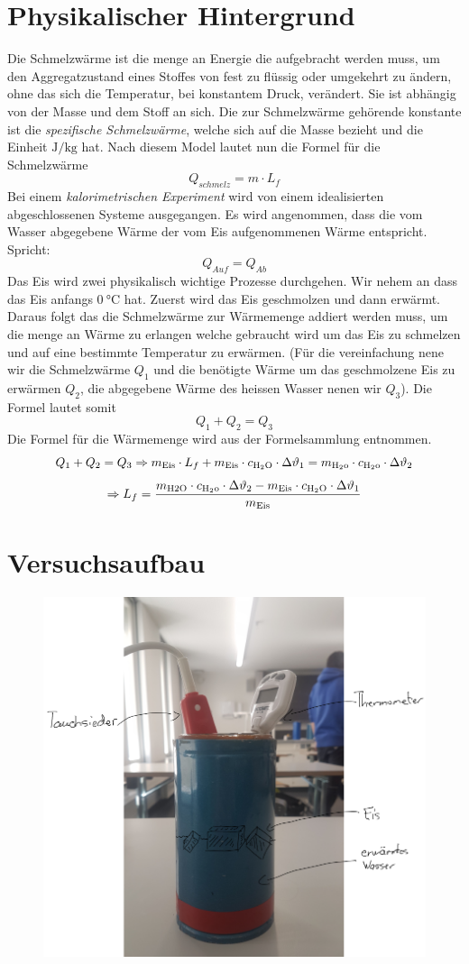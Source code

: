 \documentclass[a4paper,12pt]{article}
\begin{document}
\section{Physikalischer Hintergrund}
Die Schmelzwärme ist die menge an Energie die aufgebracht werden muss, um den Aggregatzustand eines Stoffes von fest zu flüssig oder umgekehrt zu ändern, ohne das sich die Temperatur, bei konstantem Druck, verändert. Sie ist abhängig von der Masse und dem Stoff an sich. Die zur Schmelzwärme gehörende konstante ist die \textit{spezifische Schmelzwärme}, welche sich auf die Masse bezieht und die Einheit $\si{\J\per\kg}$ hat. Nach diesem Model lautet nun die Formel für die Schmelzwärme 
$$ Q_{schmelz}= m \cdot L_f$$
Bei einem \textit{kalorimetrischen Experiment} wird von einem idealisierten abgeschlossenen Systeme ausgegangen. Es wird angenommen, dass die vom Wasser abgegebene Wärme der vom Eis aufgenommenen Wärme entspricht. Spricht:
$$ Q_{Auf}=Q_{Ab}$$
Das Eis wird zwei physikalisch wichtige Prozesse durchgehen. Wir nehem an dass das Eis anfangs $\SI{0}{\celsius}$ hat. Zuerst wird das Eis geschmolzen und dann erwärmt. Daraus folgt das die Schmelzwärme zur Wärmemenge addiert werden muss, um die menge an Wärme zu erlangen welche gebraucht wird um das Eis zu schmelzen und auf eine bestimmte Temperatur zu erwärmen. (Für die vereinfachung nene wir die Schmelzwärme $Q_{1}$ und die benötigte Wärme um das geschmolzene Eis zu erwärmen $Q_{2}$, die abgegebene Wärme des heissen Wasser nenen wir $Q_{3}$). Die Formel lautet somit
$$ Q_{1} + Q_{2} = Q_{3} $$
Die Formel für die Wärmemenge wird aus der Formelsammlung entnommen.
$$ Q_{1} + Q_{2} = Q_{3} \Rightarrow m_{\rm{Eis}} \cdot L_f + m_{\rm{Eis}} \cdot c_{\rm{H_2O}} \cdot \Delta\vartheta_1 = m_{\rm{H_2o}} \cdot c_{\rm{H_2o}} \cdot \Delta\vartheta_2$$ $$ \Rightarrow L_f = \frac{m_{\rm{H2O}} \cdot c_{\rm{H_2o}} \cdot \Delta\vartheta_2 - m_{\rm{Eis}} \cdot c_{\rm{H_2O}} \cdot \Delta\vartheta_1}{m_{\rm{Eis}}}$$



\section{Versuchsaufbau}
\begin{figure}[H]
    \centering
    \includegraphics[width=.5\linewidth]{image}
\end{figure}
\end{document}
